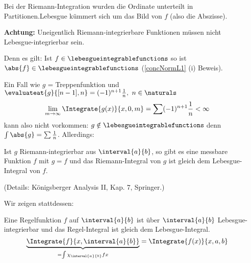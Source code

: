 \begin{erinnerung*}
  Bei der Riemann-Integration wurden die Ordinate unterteilt in Partitionen.Lebesgue kümmert sich um das Bild von \(f\) (also die Abszisse).
\end{erinnerung*}

\textbf{Achtung:} Uneigentlich Riemann-integrierbare Funktionen müssen nicht Lebesgue-integrierbar sein.

Denn es gilt: Ist \(f\in \lebesgueintegrablefunctions\) so ist \(\abs{f}\in \lebesgueintegrablefunctions\) (\ref{concNormL1} (i) Beweis).

Ein Fall wie \(g\) = Treppenfunktion und \(\evaluateat{g}{[n-1],n}=(-1)^{n+1}\frac{1}{n},\ n\in\naturals\)
\begin{equation*}
    \lim_{m\to\infty}\Integrate{g(x)}{x,0,m}=\sum(-1)^{n+1}\frac{1}{n}< \infty 
\end{equation*}
kann also nicht vorkommen: \(g\notin \lebesgueintegrablefunctions\) denn \(\int\abs{g}=\sum\frac{1}{n}\). Allerdings:

\begin{satz}
    \label{riemann_integrierbar_messbar}
    Ist \(g\) Riemann-integrierbar aus \(\interval{a}{b}\), so gibt es eine messbare Funktion \(f\) mit \(g=f\) \fue und das Riemann-Integral von \(g\) ist gleich dem Lebesgue-Integral von \(f\).
\end{satz}

(Details: Königsberger Analysis II, Kap. 7, Springer.)

Wir zeigen stattdessen:

\begin{satz}
    \label{theoRegelFkt} %
    Eine Regelfunktion \(f\) auf \(\interval{a}{b}\) ist über \(\interval{a}{b}\) Lebesgue-integrierbar und das Regel-Integral ist gleich dem Lebesgue-Integral.
    \begin{equation*}
        \underbrace{\Integrate{f}{x,\interval{a}{b}}}_{=\int{\chi_{\interval{a}{b}}f{x}}}=\Integrate{f(x)}{x,a,b}
    \end{equation*}
\end{satz}

